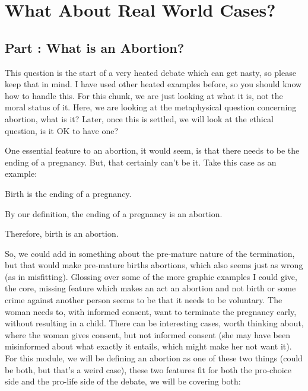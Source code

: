 \part{What About Real World Cases?}
\label{ch.modnine}

\chapter{Part \thechapcount: What is an Abortion?}\setcounter{seccount}{1}

This question is the start of a very heated debate which can get nasty, so please keep that in mind. I have used other heated examples before, so you should know how to handle this. For this chunk, we are just looking at what it is, not the moral status of it. Here, we are looking at the metaphysical question concerning abortion, what is it? Later, once this is settled, we will look at the ethical question, is it OK to have one? 

One essential feature to an abortion, it would seem, is that there needs to be the ending of a pregnancy. But, that certainly can't be it. Take this case as an example:

\begin{earg}
    \item[] Birth is the ending of a pregnancy. 
    \item[] By our definition, the ending of a pregnancy is an abortion. 
    \item[] Therefore, birth is an abortion.
\end{earg}

So, we could add in something about the pre-mature nature of the termination, but that would make pre-mature births abortions, which also seems just as wrong (as in misfitting). Glossing over some of the more graphic examples I could give, the core, missing feature which makes an act an abortion and not birth or some crime against another person seems to be that it needs to be voluntary. The woman needs to, with informed consent, want to terminate the pregnancy early, without resulting in a child. There can be interesting cases, worth thinking about, where the woman gives consent, but not informed consent (she may have been misinformed about what exactly it entails, which might make her not want it).   For this module, we will be defining an abortion as one of these two things (could be both, but that's a weird case), these two features fit for both the pro-choice side and the pro-life side of the debate, we will be covering both:

